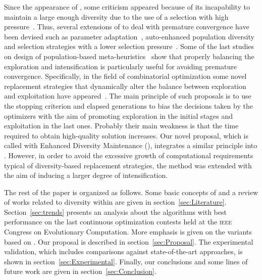 Since the appearance of \DE{}, some criticism appeared because of its incapability to maintain a large
enough diversity due to the use of a selection with high pressure~\cite{sa2008exploration}.
%
Thus, several extensions of \DE{} to deal with premature convergence have been devised 
such as parameter adaptation~\cite{zaharie2003control}, 
auto-enhanced population diversity~\cite{yang2015differential} and selection strategies 
with a lower selection pressure~\cite{sa2008exploration}.
%
Some of the last studies on design of population-based meta-heuristics~\cite{Crepinsek:13} show that 
properly balancing the exploration and intensification
is particularly useful for avoiding premature convergence.
%
Specifically, in the field of combinatorial optimization some novel replacement strategies that dynamically alter 
the balance between exploration and exploitation 
have appeared~\cite{segura2016novel}.
%
The main principle of such proposals is to use the stopping criterion and elapsed generations to bias the decisions 
taken by the optimizers with the aim of promoting exploration in the initial stages and exploitation in the last ones.
%
Probably their main weakness is that the time required to obtain high-quality solution increases.
%
Our novel proposal, which is called \DE{} with Enhanced Diversity Maintenance (\DEEDM{}), integrates a similar principle into \DE{}.
%
However, in order to avoid the excessive growth of computational requirements typical of diversity-based replacement strategies, 
the method was extended with the aim of inducing a larger degree of intensification.

The rest of the paper is organized as follows.
%
Some basic concepts of \DE{} and a review of works related to diversity within \DE{} are given in section~\ref{sec:Literature}.
%
Section~\ref{sec:trends} presents an analysis about the algorithms with best performance on the last continuous optimization 
contests held at the \textsc{ieee} Congress on Evolutionary Computation.
%
More emphasis is given on the variants based on \DE{}.
%
Our proposal is described in section~\ref{sec:Proposal}.
%
The experimental validation, which includes comparisons against state-of-the-art approaches, is shown in section~\ref{sec:Experimental}. 
%
Finally, our conclusions and some lines of future work are given in section~\ref{sec:Conclusion}.
